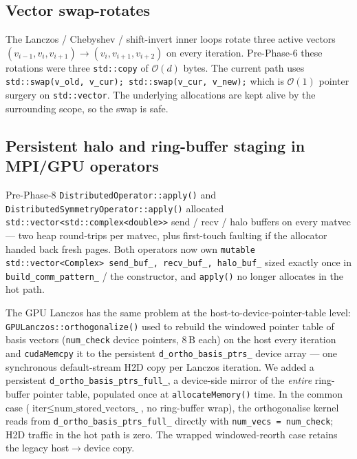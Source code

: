 \documentclass[submission, PhysCodeb]{SciPost}
\begin{document}
\subsection{Vector swap-rotates}
\label{sec:perf-swaps}
The Lanczos / Chebyshev / shift-invert inner loops rotate three
active vectors $(v_{i-1}, v_i, v_{i+1}) \to (v_i, v_{i+1}, v_{i+2})$
on every iteration. Pre-Phase-6 these rotations were three
\texttt{std::copy} of $\mathcal{O}(d)$ bytes. The current path uses
\texttt{std::swap(v\_old, v\_cur); std::swap(v\_cur, v\_new);} which
is $\mathcal{O}(1)$ pointer surgery on \texttt{std::vector}. The
underlying allocations are kept alive by the surrounding scope, so
the swap is safe.

\subsection{Persistent halo and ring-buffer staging in MPI/GPU operators}
\label{sec:perf-buffers}
Pre-Phase-8 \texttt{DistributedOperator::apply()} and
\texttt{DistributedSymmetryOperator::apply()} allocated
\texttt{std::vector<std::complex<double>>} send / recv / halo buffers
on every matvec --- two heap round-trips per matvec, plus
first-touch faulting if the allocator handed back fresh pages. Both
operators now own \texttt{mutable std::vector<Complex> send\_buf\_,
recv\_buf\_, halo\_buf\_} sized exactly once in
\texttt{build\_comm\_pattern\_} / the constructor, and \texttt{apply()}
no longer allocates in the hot path.

The GPU Lanczos has the same problem at the
host-to-device-pointer-table level: \texttt{GPULanczos::orthogonalize()}
used to rebuild the windowed pointer table of basis vectors
(\texttt{num\_check} device pointers, $8\,\mathrm{B}$ each) on the
host every iteration and \texttt{cudaMemcpy} it to the persistent
\texttt{d\_ortho\_basis\_ptrs\_} device array --- one synchronous
default-stream H2D copy per Lanczos iteration. We added a persistent
\texttt{d\_ortho\_basis\_ptrs\_full\_}, a device-side mirror of the
\emph{entire} ring-buffer pointer table, populated once at
\texttt{allocateMemory()} time. In the common case
($\text{iter} \le \text{num\_stored\_vectors\_}$, no ring-buffer
wrap), the orthogonalise kernel reads from
\texttt{d\_ortho\_basis\_ptrs\_full\_} directly with
\texttt{num\_vecs = num\_check}; H2D traffic in the hot path is zero.
The wrapped windowed-reorth case retains the legacy host$\to$device
copy.
\end{document}
